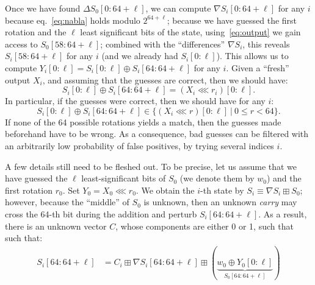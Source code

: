 \documentclass[submission,svgnames,journal=tosc]{iacrtrans}
\begin{document}
Once we have found $\Delta S_0[0:64+\ell]$, we can compute
$\nabla S_i[0:64+\ell]$ for any $i$ because eq.~\eqref{eq:nabla} holds modulo
$2^{64+\ell}$; because we have guessed the first rotation and the $\ell$ least
significant bits of the state, using~\eqref{eq:output} we gain access to
$S_0[58:64+\ell]$; combined with the ``differences'' $\nabla S_i$, this reveals
$S_i[58:64+\ell]$ for any $i$ (and we already had $S_i[0:\ell]$). This allows us
to compute $Y_i[0:\ell] = S_i[0:\ell] \oplus S_i[64:64+\ell]$ for any $i$. Given
a ``fresh'' output $X_i$, and assuming that the guesses are correct, then we
should have:
\begin{equation}\label{eq:find_rotation}
  S_i[0:\ell] \oplus S_i[64:64+\ell] = (X_i \lll r_i)[0:\ell].
\end{equation}
In particular, if the guesses were correct, then we should have for any $i$:
\begin{equation}\label{eq:consistency}
  S_i[0:\ell] \oplus S_i[64:64+\ell] \in \bigl\{ (X_i \lll r)[0:\ell]~|~0 \leq r < 64 \bigr\}.
\end{equation}
If none of the 64 possible rotations yields a match, then the guesses made
beforehand have to be wrong. As a consequence, bad guesses can be filtered with
an arbitrarily low probability of false positives, by trying several indices
$i$.

A few details still need to be fleshed out. To be precise, let us assume that we
have guessed the $\ell$ least-significant bits of $S_0$ (we denote them by
$w_0$) and the first rotation $r_0$. Set $Y_0 = X_0 \lll r_0$. %
We obtain the $i$-th state by $S_i \equiv \nabla S_i \boxplus S_0$; however,
because the ``middle'' of $S_0$ is unknown, then an unknown \emph{carry} may
cross the 64-th bit during the addition and perturb $S_i[64:64+\ell]$. As a
result, there is an unknown vector $C$, whose components are either 0 or 1, such
that such that:
\begin{align*}
  S_i[64:64+\ell] &= C_i \boxplus \nabla S_i[64:64+\ell] \boxplus (\underbrace{w_0 \oplus Y_0[0:\ell]}_{S_0[64:64+\ell]}) \\
\end{align*}
\end{document}
